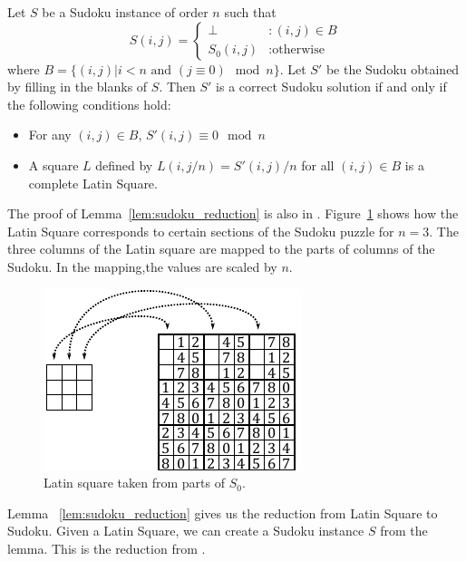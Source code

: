 \documentclass[runningheads,a4paper]{llncs}
\begin{document}
\begin{lemma}
\label{lem:sudoku_reduction}
Let $S$ be a Sudoku instance of order $n$ such that
\begin{displaymath}
S(i,j) = \left\{
\begin{array}{lr}
\perp & : (i,j) \in B\\
S_0 (i,j) & : \text{otherwise}
\end{array}
\right.
\end{displaymath}
where $B = \{ (i,j) | i < n \text{ and } (j \equiv 0) \mod n \}$. Let $S'$ be the Sudoku obtained by filling in the blanks of $S$. Then $S'$ is a correct Sudoku solution if and only if the following conditions hold:
\begin{itemize}
\item For any $(i,j) \in B$, $S'(i,j) \equiv 0 \mod n$
\item A square $L$ defined by $L(i, j/n) = S'(i,j)/n$ for all $(i, j) \in B$ is a complete Latin Square.
\end{itemize}
\end{lemma}

The proof of Lemma~\ref{lem:sudoku_reduction} is also in \cite{takayuki2003complexity}. Figure~\ref{fig:latinsquare_to_sudoku} shows how the Latin Square corresponds to certain sections of the Sudoku puzzle for $n=3$. The three columns of the Latin square are mapped to the parts of columns of the Sudoku. In the mapping,the values are scaled by $n$. 

\begin{figure}
\centering
\label{fig:latinsquare_to_sudoku}
\includegraphics[width=0.7\linewidth]{latinsquare_to_sudoku.pdf}
\caption{Latin square taken from parts of $S_0$.}
\end{figure}

Lemma ~\ref{lem:sudoku_reduction} gives us the reduction from Latin Square to Sudoku. Given a Latin Square, we can create a Sudoku instance $S$ from the lemma. This is the reduction from \cite{takayuki2003complexity}.
\end{document}
